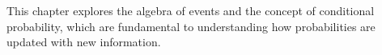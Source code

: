 This chapter explores the algebra of events and the concept of conditional probability, which are fundamental to understanding how probabilities are updated with new information.
